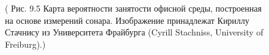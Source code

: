 \documentclass[10pt,a4paper]{article}
\begin{document}
\begin{figure}[H]
	\caption{ ( Рис. 9.5 Карта вероятности занятости офисной среды, построенная на основе измерений сонара. Изображение принадлежат Кириллу Стачнису из Университета Фрайбурга (Cyrill Stachniss, University of Freiburg).)}
	\label{fig:95orig}
\end{figure}
\end{document}
